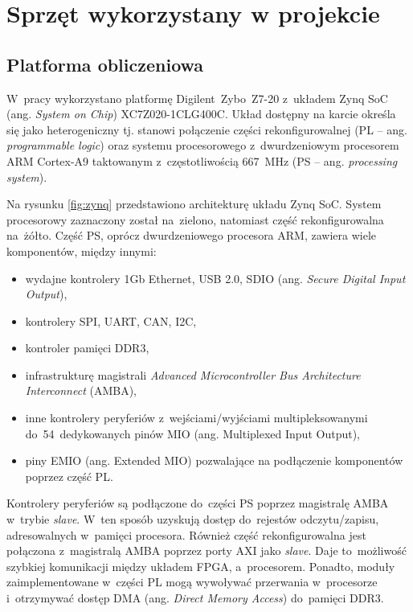 \chapter{Sprzęt wykorzystany w projekcie}
\label{cha:Zybo_PCAM_dron}


\section{Platforma obliczeniowa}
\label{sec:platforma_obliczeniowa}

W~pracy wykorzystano platformę Digilent~Zybo~Z7-20 z~układem Zynq SoC (ang. \textit{System on Chip}) XC7Z020-1CLG400C. 
Układ dostępny na karcie określa się jako heterogeniczny tj. stanowi połączenie części rekonfigurowalnej (PL -- ang. \textit{programmable logic}) oraz systemu procesorowego z~dwurdzeniowym procesorem ARM Cortex-A9 taktowanym z~częstotliwością 667~MHz (PS -- ang. \textit{processing system}).

Na rysunku \ref{fig:zynq} przedstawiono architekturę układu Zynq SoC. 
System procesorowy zaznaczony został na~zielono, natomiast część rekonfigurowalna na~żółto. 
Część PS, oprócz dwurdzeniowego procesora ARM, zawiera wiele komponentów, między innymi:
\begin{itemize}
	\item wydajne kontrolery 1Gb Ethernet, USB 2.0, SDIO (ang. \textit{Secure Digital Input Output}),
	\item kontrolery SPI, UART, CAN, I2C,
	\item kontroler pamięci DDR3,
	\item infrastrukturę magistrali \textit{Advanced Microcontroller Bus Architecture Interconnect} (AMBA),
	\item inne kontrolery peryferiów z~wejściami/wyjściami multipleksowanymi do~54~dedykowanych pinów MIO (ang. Multiplexed Input Output),
	\item piny EMIO (ang. Extended MIO) pozwalające na podłączenie komponentów poprzez część PL.
\end{itemize}

Kontrolery peryferiów są podłączone do~części PS poprzez magistralę AMBA w~trybie \textit{slave}. 
W~ten sposób uzyskują dostęp do~rejestów odczytu/zapisu, adresowalnych w~pamięci procesora. 
Również część rekonfigurowalna jest połączona z~magistralą AMBA poprzez porty AXI jako \textit{slave}. 
Daje to~możliwość szybkiej komunikacji między układem FPGA, a~procesorem. 
Ponadto, moduły zaimplementowane w~części PL mogą wywoływać przerwania w~procesorze i~otrzymywać dostęp DMA (ang. \textit{Direct Memory Access}) do~pamięci DDR3.

